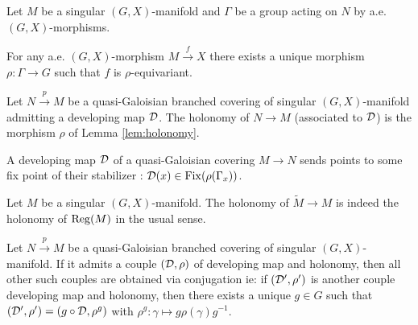 \begin{lem} \label{lem:holonomy} Let $M$ be a singular $(G,X)$-manifold and $\Gamma$ be a group acting on $N$ by a.e. $(G,X)$-morphisms. 

For any a.e. $(G,X)$-morphism $M\xrightarrow{f} X $  there exists a unique morphism $\rho:\Gamma\rightarrow G$ such that $f$ is $\rho$-equivariant.
\end{lem}
\begin{defi}\label{def:quasi_galoisian_branched_covering_singular} 
 Let $N\xrightarrow{p} M$ be a quasi-Galoisian branched covering of singular $(G,X)$-manifold admitting a developing map $\mathcal{D}$. The holonomy of $N\rightarrow M$ (associated to $\mathcal{D}$) is the morphism $\rho$ of Lemma \ref{lem:holonomy}.
\end{defi}
 \begin{rem}\label{rem:developing_map_quasi_galoisian_covering}
    A developing map $\mathcal{D}$ of a quasi-Galoisian covering $M\rightarrow N$ sends points to some fix point of their stabilizer : $\mathcal{D}(x) \in \mathrm{Fix}(\rho(\Gamma_x))$.
  \end{rem}
  
\begin{rem}\label{rem:singular_manifold_holonomy_indeed} 
 Let $M$ be a singular $(G,X)$-manifold. The holonomy of $\widetilde M \rightarrow M$ is indeed the holonomy of $\mathrm{Reg}(M)$ in the usual sense.
\end{rem}
\begin{lem}\label{lem:quasi_galoisian_branched_covering_singular}
 Let $N\xrightarrow{p} M$ be a quasi-Galoisian branched covering of singular $(G,X)$-manifold. If it admits a couple $(\mathcal{D},\rho)$ of developing map and holonomy, then all other such couples are obtained via conjugation ie:
 if $(\mathcal{D}',\rho')$ is another couple developing map and holonomy, then there exists a unique $g\in G$ such that $(\mathcal{D}',\rho')= (g\circ\mathcal{D},\rho^g)$ with $\rho^g  : \gamma \mapsto g\rho(\gamma)g^{-1}$.
\end{lem}


